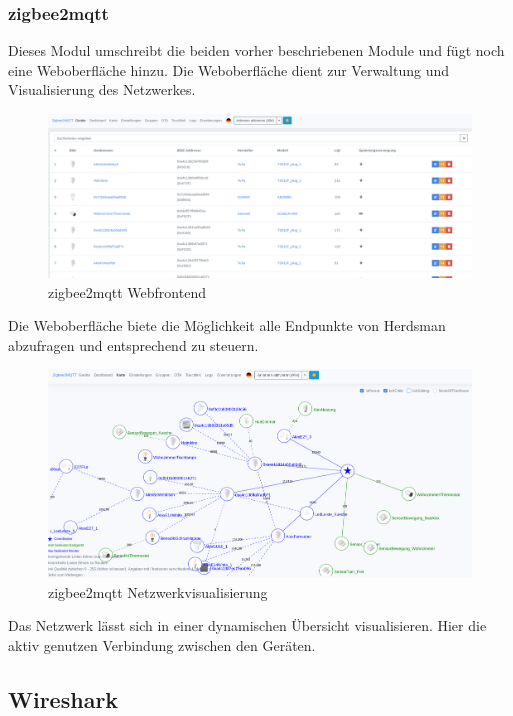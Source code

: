 \subsubsection{zigbee2mqtt}

Dieses Modul umschreibt die beiden vorher beschriebenen Module und fügt noch eine Weboberfläche hinzu. Die Weboberfläche dient zur Verwaltung und Visualisierung des Netzwerkes.
\begin{figure}[H]
  \centering
  \includegraphics[width=1\textwidth]{media/z2m.png}
  \caption{zigbee2mqtt Webfrontend}
\end{figure}

Die Weboberfläche biete die Möglichkeit alle Endpunkte von Herdsman abzufragen und entsprechend zu steuern.

\begin{figure}[H]
  \centering
  \includegraphics[width=1\textwidth]{media/z2m-map.png}
  \caption{zigbee2mqtt Netzwerkvisualisierung}
\end{figure}

Das Netzwerk lässt sich in einer dynamischen Übersicht visualisieren. Hier die aktiv genutzen Verbindung zwischen den Geräten. 

\subsection{Wireshark}

